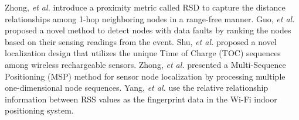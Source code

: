 Zhong, \emph{et al.} \cite{zhong2009achieving} introduce a proximity metric called RSD to capture the distance relationships among 1-hop neighboring nodes in a range-free manner. 
Guo, \emph{et al.} \cite{guo2009find}  proposed a novel method to detect nodes with data faults by ranking the nodes based on their sensing
readings from the event.
Shu, \emph{et al.} \cite{shu2015toc}  proposed a novel localization design that utilizes the unique Time of Charge (TOC) sequences among wireless rechargeable sensors.
Zhong, \emph{et al.} \cite{zhong2012wireless} presented a Multi-Sequence Positioning (MSP) method for  sensor node localization by processing multiple one-dimensional node sequences.
Yang, \emph{et al.} \cite{yang2013freeloc} use the relative relationship information between RSS values as the fingerprint data in the Wi-Fi indoor positioning system.




